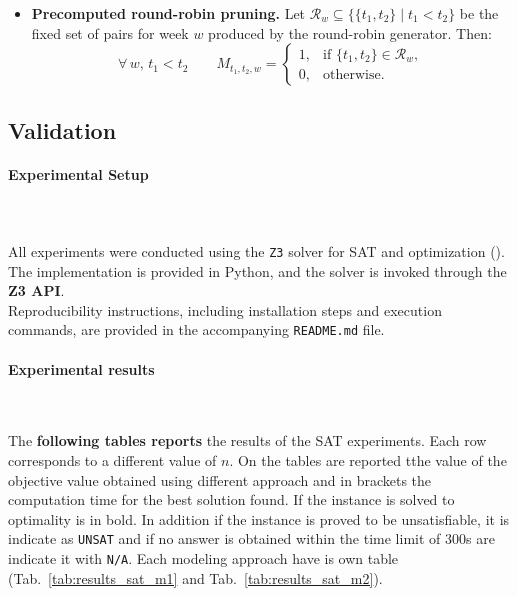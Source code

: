 \begin{itemize}
\item[(P1)] \textbf{Precomputed round-robin pruning.}
Let \(\mathcal{R}_w\subseteq\{\{t_1,t_2\}\mid t_1<t_2\}\) be the fixed set of pairs for week \(w\) produced by the round-robin generator. Then:
\[
\forall\, w,\, t_1<t_2\qquad
M_{t_1,t_2,w} =
\begin{cases}
1, & \text{if }\{t_1,t_2\}\in \mathcal{R}_w,\\[4pt]
0, & \text{otherwise.}
\end{cases}
\]
\end{itemize}



\subsection{Validation}
\label{sub:validation_sat}

\paragraph{Experimental Setup} \mbox{}\\
\\
All experiments were conducted using the \texttt{Z3} solver for SAT and
optimization (\cite{z3}). The implementation is provided in Python, and the solver is
invoked through the \textbf{Z3 API}. 
\\

Reproducibility instructions, including installation steps and execution
commands, are provided in the accompanying \texttt{README.md} file.



\paragraph{Experimental results} \mbox{}\\
\label{par:Experimental_result_SAT}

The \textbf{following tables reports} the results of the SAT experiments. 
Each row corresponds to a different value of $n$. 
On the tables are reported tthe value of the objective value obtained using different approach and in brackets the computation time for the best solution found. If the instance is solved to optimality is in bold. In addition if the instance is proved to be
unsatisfiable, it is indicate as \texttt{UNSAT} and if no answer is obtained within the
time limit of 300s are indicate it with \texttt{N/A}.
Each modeling approach have is own table (Tab.~\ref{tab:results_sat_m1} and Tab.~\ref{tab:results_sat_m2}).  


